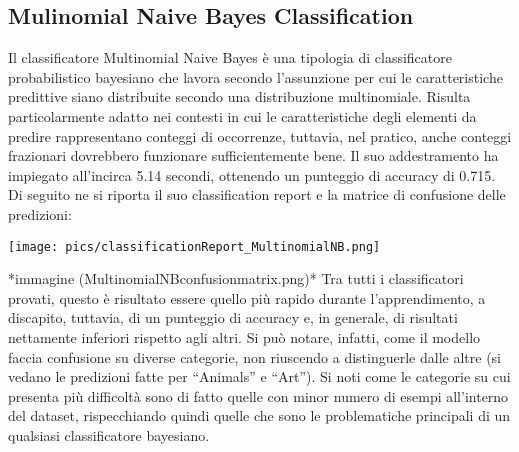\documentclass[12pt,oneside]{article}
\begin{document}
    \begin{enumerate}
    \subsection{Mulinomial Naive Bayes Classification}
    \begin{justify}
        Il classificatore Multinomial Naive Bayes è una tipologia di classificatore probabilistico bayesiano che lavora secondo l’assunzione per cui le caratteristiche predittive siano distribuite secondo una distribuzione multinomiale. Risulta particolarmente adatto nei contesti in cui le caratteristiche degli elementi da predire rappresentano conteggi di occorrenze, tuttavia, nel pratico, anche conteggi frazionari dovrebbero funzionare sufficientemente bene.
        Il suo addestramento ha impiegato all’incirca 5.14 secondi, ottenendo un punteggio di accuracy di 0.715. Di seguito ne si riporta il suo classification report e la matrice di confusione delle predizioni:
    \end{justify}
    \texttt{[image: pics/classificationReport\_MultinomialNB.png]}   

    \begin{justify}
        *immagine (MultinomialNBconfusionmatrix.png)*
        Tra tutti i classificatori provati, questo è risultato essere quello più rapido durante l’apprendimento, a discapito, tuttavia, di un punteggio di accuracy e, in generale, di risultati nettamente inferiori rispetto agli altri. Si può notare, infatti, come il modello faccia confusione su diverse categorie, non riuscendo a distinguerle dalle altre (si vedano le predizioni fatte per “Animals” e “Art”). Si noti come le categorie su cui presenta più difficoltà sono di fatto quelle con minor numero di esempi all’interno del dataset, rispecchiando quindi quelle che sono le problematiche principali di un qualsiasi classificatore bayesiano.
    \end{justify}
    \end{enumerate}
    
\end{document}
